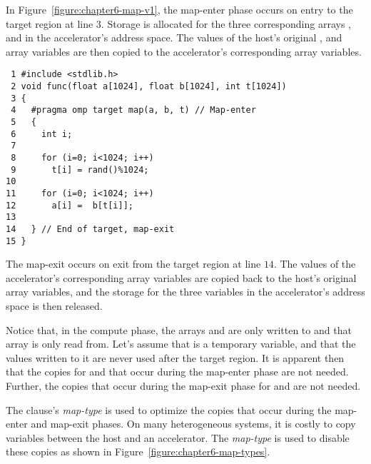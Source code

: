 In Figure~\ref{figure:chapter6-map-v1}, the map-enter phase occurs on entry to
the target region at line $3$.  Storage is allocated for the three
corresponding arrays ,  and  in the accelerator's address space.  The
values of the host's original ,  and  array variables are then copied
to the accelerator's corresponding array variables. 

\begin{figure*}[!b]
\begin{verbatim}
 1 #include <stdlib.h>
 2 void func(float a[1024], float b[1024], int t[1024])
 3 {
 4   #pragma omp target map(a, b, t) // Map-enter
 5   {
 6     int i;
 7 
 8     for (i=0; i<1024; i++)
 9       t[i] = rand()%1024;
10 
11     for (i=0; i<1024; i++)
12       a[i] =  b[t[i]];
13 
14   } // End of target, map-exit
15 }
\end{verbatim}
\caption{ \textbf {Example of the map clause} -- \small
          Copies occur for the arrays \texttt{a}, \texttt{b}, and 
          \texttt{t} at the entry to and exit from the target region.
         }
\label{figure:chapter6-map-v1}
\end{figure*}

The map-exit occurs on exit from the target region at line $14$.  The values of
the accelerator's corresponding array variables are copied back to the host's
original array variables, and the storage for the three variables in the
accelerator's address space is then released.

Notice that, in the compute phase, the arrays  and  are only written to and
that array  is only read from.  Let's assume that  is a temporary variable, and
that the values written to it are never used after the target region.  It is
apparent then that the copies for  and  that occur during the map-enter
phase are not needed.  Further, the copies that occur during the map-exit phase
for  and  are not needed.  

The  clause's \emph{map-type} is used to optimize the copies that
occur during the map-enter and map-exit phases. On many heterogeneous systems,
it is costly to copy variables between the host and an accelerator.  The
\emph{map-type} is used to disable these copies as shown in
Figure~\ref{figure:chapter6-map-types}.

